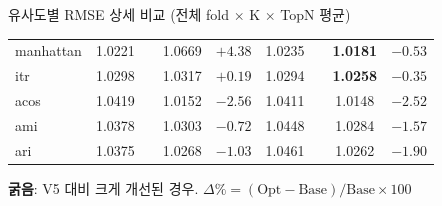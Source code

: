 \documentclass[aspectratio=169,10pt]{beamer}
\begin{document}
\begin{frame}[shrink=12]{유사도별 RMSE 상세 비교 \textnormal{\small(전체 fold $\times$ K $\times$ TopN 평균)}}
\begin{center}
\begin{tabular}{l|cc|cc|cc|cc}
		manhattan     & 1.0221 & & 1.0669 & \textcolor{negred}{$+4.38$} & 1.0235 & & \textbf{1.0181} & \textcolor{testgreen}{$-0.53$} \\
		itr           & 1.0298 & & 1.0317 & \textcolor{negred}{$+0.19$} & 1.0294 & & \textbf{1.0258} & \textcolor{testgreen}{$-0.35$} \\
		acos          & 1.0419 & & 1.0152 & \textcolor{testgreen}{$-2.56$} & 1.0411 & & 1.0148 & \textcolor{testgreen}{$-2.52$} \\
		ami           & 1.0378 & & 1.0303 & \textcolor{testgreen}{$-0.72$} & 1.0448 & & 1.0284 & \textcolor{testgreen}{$-1.57$} \\
		ari           & 1.0375 & & 1.0268 & \textcolor{testgreen}{$-1.03$} & 1.0461 & & 1.0262 & \textcolor{testgreen}{$-1.90$} \\
		\bottomrule
	\end{tabular}
	\end{center}
	{\scriptsize
	\textbf{굵음}: V5 대비 크게 개선된 경우.\quad
	$\Delta\% = (\text{Opt}-\text{Base})/\text{Base}\times100$
	}
\end{frame}
\end{document}
